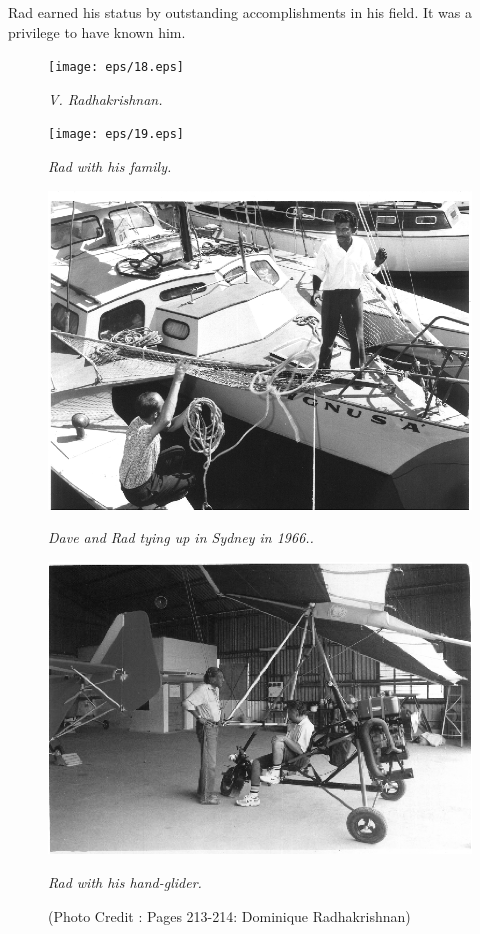 Rad earned his status by outstanding accomplishments in his field. It was a privilege to have known him.
\begin{figure}[H]
\centering
\texttt{[image: eps/18.eps]}

{\fontsize{10pt}{12pt}\selectfont\em V. Radhakrishnan.}\relax
\end{figure}

\begin{figure}[H]%
\centering
\texttt{[image: eps/19.eps]}

{\fontsize{10pt}{12pt}\selectfont\em Rad with his family.}\relax
\end{figure}

\begin{figure}[H]
\centering
\includegraphics[scale=.95]{eps/20.eps}

{\fontsize{10pt}{12pt}\selectfont\em Dave and Rad tying up in Sydney in 1966..}\relax
\end{figure}

\begin{figure}[H]
\centering
\includegraphics[scale=.95]{eps/21.eps}

{\fontsize{10pt}{12pt}\selectfont\em Rad with his hand-glider.}\relax

{\fontsize{10pt}{12pt}\selectfont (Photo Credit : Pages 213-214: Dominique Radhakrishnan)}\relax
\end{figure}

